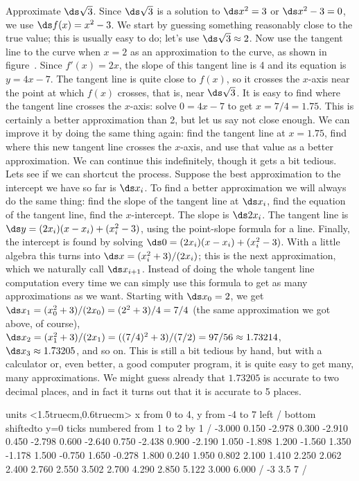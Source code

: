 \begin{example} Approximate $\ds \sqrt{3}$. Since $\ds \sqrt{3}$ is a solution to
$\ds x^2=3$ or $\ds x^2-3=0$, we use $\ds f(x)=x^2-3$. We start by guessing
something reasonably close to the true value; this is usually easy to
do; let's use $\ds \sqrt3\approx2$. Now use the tangent line to the curve
when $x=2$ as an approximation to the curve, as shown in
figure~. Since $f'(x)=2x$, the slope of this
tangent line is 4 and its equation is $y=4x-7$. The tangent line is
quite close to $f(x)$, so it crosses the $x$-axis near the point at
which $f(x)$ crosses, that is, near $\ds \sqrt3$. It is easy to find where
the tangent line crosses the $x$-axis: solve $0=4x-7$ to get
$x=7/4=1.75$. This is certainly a better approximation than 2, but let
us say not close enough. We can improve it by doing the same thing
again: find the tangent line at $x=1.75$, find where this new tangent
line crosses the $x$-axis, and use that value as a better
approximation. We can continue this indefinitely, though it gets a bit
tedious. Lets see if we can shortcut the process. Suppose the best
approximation to the intercept we have so far is $\ds x_i$. To find a
better approximation we will always
do the same thing: find the slope of the tangent line at $\ds x_i$, find the
equation of the tangent line, find the $x$-intercept. The slope is
$\ds 2x_i$. The tangent line is $\ds y=(2x_i)(x-x_i)+(x_i^2-3)$, using
the point-slope formula for a line. Finally, the intercept is found by
solving $\ds 0 =(2x_i)(x-x_i)+(x_i^2-3)$. With a little algebra this turns
into $\ds x=(x_i^2+3)/(2x_i)$; this is the next approximation, which we
naturally call $\ds x_{i+1}$. Instead of doing the whole tangent line
computation every time we can simply use this formula to get as many
approximations as we want. Starting with $\ds x_0=2$, we get
$\ds x_1=(x_0^2+3)/(2x_0)=(2^2+3)/4=7/4$ (the same approximation we got
above, of course), $\ds x_2=(x_1^2+3)/(2x_1)=
((7/4)^2+3)/(7/2)=97/56\approx 1.73214$, $\ds x_3\approx 1.73205$, and so
on. This is still a bit tedious by hand, but with a calculator or,
even better, a good computer program, it is quite easy to get many,
many approximations. We might guess already that $1.73205$ is accurate
to two decimal places, and in fact it turns out that it is accurate to
5 places.  \end{example}

\figure
\vbox{\beginpicture
\normalgraphs
\sevenpoint
\setcoordinatesystem units <1.5truecm,0.6truecm>
\setplotarea x from 0 to 4, y from -4 to 7
\axis left /
\axis bottom shiftedto y=0 ticks numbered from 1 to 2 by 1 /
 -3.000 0.150 -2.978 0.300 -2.910 0.450 -2.798 0.600 -2.640 
0.750 -2.438 0.900 -2.190 1.050 -1.898 1.200 -1.560 1.350 -1.178 
1.500 -0.750 1.650 -0.278 1.800 0.240 1.950 0.802 2.100 1.410 
2.250 2.062 2.400 2.760 2.550 3.502 2.700 4.290 2.850 5.122 
3.000 6.000 /
\setlinear
{} -3 3.5 7 /
\endpicture}
\endfigure{Newton's method.
(\expandafter\url\expandafter{\liveurl jsxgraph/newtons_method.html}%
AP\endurl)}


